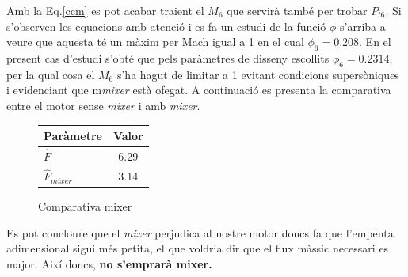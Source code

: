 Amb la Eq.\ref{ccm} es pot acabar traient el $M_6$ que servirà també per trobar $P_{t6}$. Si s'observen les equacions amb atenció i es fa un estudi de la funció $\phi$ s'arriba a veure que aquesta té un màxim per Mach igual a 1 en el cual $\phi_6=0.208$. En el present cas d'estudi s'obté que pels paràmetres de disseny escollits $\phi_6=0.2314$, per la qual cosa el $M_6$ s'ha hagut de limitar a 1 evitant condicions supersòniques i evidenciant que m\textit{mixer} està ofegat.
A continuació es presenta la comparativa entre el motor sense \textit{mixer} i amb \textit{mixer}.
\begin{figure}[H]
	\centering
	\begin{tabular}{lc}
		\toprule[3pt]
		\textbf{Paràmetre}&\textbf{Valor}\\
		\midrule[1pt]
		$\hat{F}$ & 6.29 \\
		$\hat{F}_{mixer}$ & 3.14 \\
		\bottomrule[2pt]
	\end{tabular}
	\label{C_opti2}
	\caption{Comparativa mixer}
\end{figure}
\noindent Es pot concloure que el\textit{ mixer} perjudica al nostre motor doncs fa que l'empenta adimensional sigui més petita, el que voldria dir que el flux màssic necessari es major. Així doncs,\textbf{ no s'emprarà mixer.}